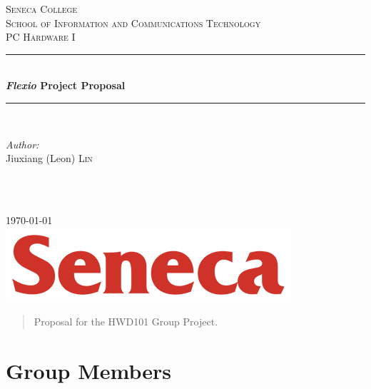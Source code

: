 \documentclass[12pt]{article}
\begin{document}
\begin{titlepage}

\newcommand{\HRule}{\rule{\linewidth}{0.5mm}} %

\center %
 
\textsc{\LARGE Seneca College}\\[1.5cm]
\textsc{\Large School of Information and Communications Technology}\\[0.5cm]
\textsc{\large PC Hardware I}\\[0.5cm]

\HRule \\[0.4cm]
{ \huge \bfseries \textit{Flexio} Project Proposal}\\[0.4cm] %
\HRule \\[1.5cm]
 
\begin{minipage}{0.4\textwidth}
\begin{flushleft} \large
\emph{Author:}\\
Jiuxiang (Leon) \textsc{Lin}
\end{flushleft}
\end{minipage}
~
\begin{minipage}{0.4\textwidth}
\begin{flushright} \large
\end{flushright}
\end{minipage}\\[2cm]

{\large \today}\\[2cm]

\includegraphics{logo.png}\\[1cm]

\vfill

\end{titlepage}


\begin{abstract}
Proposal for the HWD101 Group Project.	
\end{abstract}

\section{Group Members}
\end{document}
